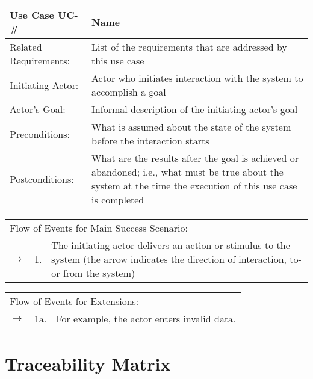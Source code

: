 \documentclass[11pt]{article}
\begin{document}
\begin{center}
\begin{tabular}{p{1.5in}p{5in}}
\hline
\textbf{Use Case UC-\#}     & \textbf{Name} \\ \hline
Related Requirements: & List of the requirements that are addressed by this use case \\
Initiating Actor:     & Actor who initiates interaction with the system to accomplish a goal \\
Actor's Goal:          & Informal description of the initiating actor’s goal \\
Preconditions:         & What is assumed about the state of the system before the interaction starts \\
Postconditions:        & What are the results after the goal is achieved or abandoned; i.e., what must be true about the system at the time the execution of this use case is completed
\end{tabular}

\begin{tabular}{p{.25in}p{.25in}p{5.8in}}
\multicolumn{3}{l}{Flow of Events for Main Success Scenario:} \\
$\rightarrow$ & 1. & The initiating actor delivers an action or stimulus to the system (the arrow indicates the direction of interaction, to- or from the system)
\end{tabular}

\begin{tabular}{p{.25in}p{.25in}p{5.8in}}
\multicolumn{3}{l}{Flow of Events for Extensions:} \\
$\rightarrow$ & 1a. & For example, the actor enters invalid data.
\end{tabular}
\end{center}

\newpage

\section{Traceability Matrix}
\end{document}

